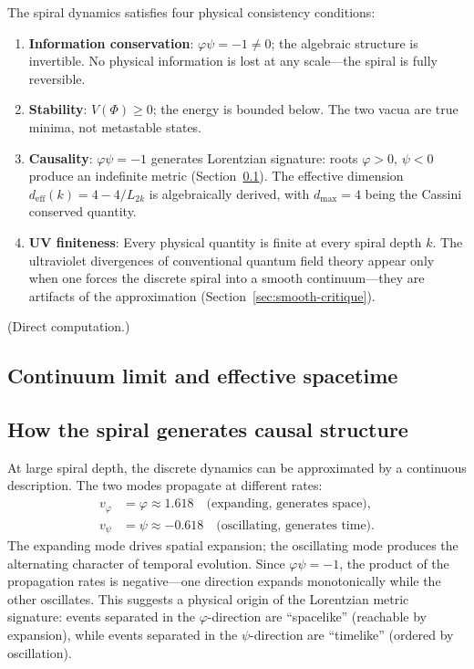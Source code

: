 \documentclass[12pt,a4paper]{article}
\begin{document}
The spiral dynamics satisfies four physical consistency conditions:
\begin{enumerate}
\item \textbf{Information conservation}: $\varphi\psi = -1 \neq 0$; the algebraic structure is invertible. No physical information is lost at any scale---the spiral is fully reversible.
\item \textbf{Stability}: $V(\Phi) \geq 0$; the energy is bounded below. The two vacua are true minima, not metastable states.
\item \textbf{Causality}: $\varphi\psi = -1$ generates Lorentzian signature: roots $\varphi > 0$, $\psi < 0$ produce an indefinite metric (Section~\ref{sec:continuum}). The effective dimension $d_{\mathrm{eff}}(k) = 4 - 4/L_{2k}$ is algebraically derived, with $d_{\max} = 4$ being the Cassini conserved quantity.
\item \textbf{UV finiteness}: Every physical quantity is finite at every spiral depth $k$. The ultraviolet divergences of conventional quantum field theory appear only when one forces the discrete spiral into a smooth continuum---they are artifacts of the approximation (Section~\ref{sec:smooth-critique}).
\end{enumerate}

\noindent (Direct computation.)



\subsection{Continuum limit and effective spacetime}
\label{sec:continuum}


\subsection{How the spiral generates causal structure}

At large spiral depth, the discrete dynamics can be approximated by a continuous description. The two modes propagate at different rates:
\begin{align}
v_\varphi &= \varphi \approx 1.618 \quad \text{(expanding, generates space)}, \\
v_\psi &= \psi \approx -0.618 \quad \text{(oscillating, generates time)}.
\end{align}
The expanding mode drives spatial expansion; the oscillating mode produces the alternating character of temporal evolution. Since $\varphi\psi = -1$, the product of the propagation rates is negative---one direction expands monotonically while the other oscillates. This suggests a physical origin of the Lorentzian metric signature: events separated in the $\varphi$-direction are ``spacelike'' (reachable by expansion), while events separated in the $\psi$-direction are ``timelike'' (ordered by oscillation).
\end{document}
